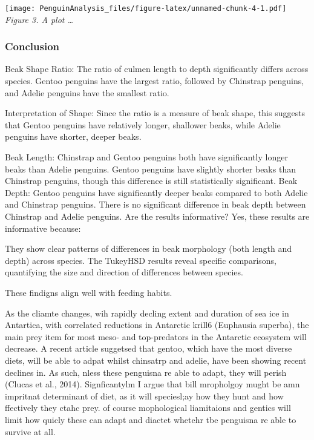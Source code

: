 \documentclass[
]{article}
\begin{document}
\texttt{[image: PenguinAnalysis\_files/figure-latex/unnamed-chunk-4-1.pdf]}
\emph{Figure 3. A plot \ldots{} }

\subsubsection{Conclusion}\label{conclusion}

Beak Shape Ratio: The ratio of culmen length to depth significantly
differs across species. Gentoo penguins have the largest ratio, followed
by Chinstrap penguins, and Adelie penguins have the smallest ratio.

Interpretation of Shape: Since the ratio is a measure of beak shape,
this suggests that Gentoo penguins have relatively longer, shallower
beaks, while Adelie penguins have shorter, deeper beaks.

Beak Length: Chinstrap and Gentoo penguins both have significantly
longer beaks than Adelie penguins. Gentoo penguins have slightly shorter
beaks than Chinstrap penguins, though this difference is still
statistically significant. Beak Depth: Gentoo penguins have
significantly deeper beaks compared to both Adelie and Chinstrap
penguins. There is no significant difference in beak depth between
Chinstrap and Adelie penguins. Are the results informative? Yes, these
results are informative because:

They show clear patterns of differences in beak morphology (both length
and depth) across species. The TukeyHSD results reveal specific
comparisons, quantifying the size and direction of differences between
species.

These findigns align well with feeding habits.

As the cliamte changes, wih rapidly decling extent and duration of sea
ice in Antartica, with correlated reductions in Antarctic krill6
(Euphausia superba), the main prey item for most meso- and top-predators
in the Antarctic ecosystem will decrease. A recent article suggetsed
that gentoo, which have the most diverse diets, will be able to adpat
whilst chinsatrp and adelie, have been showing recent declines in. As
such, nless these penguisna re able to adapt, they will perish (Clucas
et al., 2014). Signficantylm I argue that bill mropholgoy mught be amn
impritnat determinant of diet, as it will speciesl;ay how they hunt and
how ffectively they ctahc prey. of course mophological liamitaions and
gentics will limit how quicly these can adapt and diactet whetehr tbe
penguisna re able to survive at all.
\end{document}
